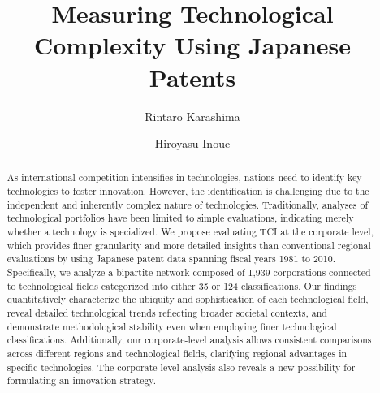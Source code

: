 \documentclass[fleqn,10pt]{wlscirep}
\begin{document}
\title{Measuring Technological Complexity Using Japanese Patents}
\author[1]{Rintaro Karashima}
\author[1, 2, *]{Hiroyasu Inoue}



\begin{abstract}
As international competition intensifies in technologies, nations need to identify key technologies to foster innovation. 
However, the identification is challenging due to the independent and inherently complex nature of technologies. 
Traditionally, analyses of technological portfolios have been limited to simple evaluations, indicating merely whether a technology is specialized. 
We propose evaluating TCI at the corporate level, which provides finer granularity and more detailed insights than conventional regional evaluations by using Japanese patent data spanning fiscal years 1981 to 2010. 
Specifically, we analyze a bipartite network composed of 1,939 corporations connected to technological fields categorized into either 35 or 124 classifications. 
Our findings quantitatively characterize the ubiquity and sophistication of each technological field, reveal detailed technological trends reflecting broader societal contexts, and demonstrate methodological stability even when employing finer technological classifications. 
Additionally, our corporate-level analysis allows consistent comparisons across different regions and technological fields, clarifying regional advantages in specific technologies.
The corporate level analysis also reveals a new possibility for formulating an innovation strategy.

\end{abstract}

\flushbottom
\maketitle

\thispagestyle{empty}



\end{document}
